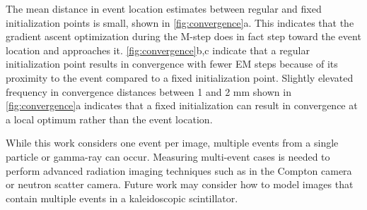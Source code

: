 The mean distance in event location estimates between regular and fixed 
initialization points is small, shown in \cref{fig:convergence}a.
This indicates that the gradient ascent optimization during the M-step does in 
fact step toward the event location and approaches it.
\cref{fig:convergence}b,c indicate that a regular initialization point results in 
convergence with fewer EM steps because of its proximity to the event compared to 
a fixed initialization point. 
Slightly elevated frequency in convergence distances between 1 and 2 mm shown in 
\cref{fig:convergence}a indicates that a fixed initialization can result in 
convergence at a local optimum rather than the event location.

While this work considers one event per image, multiple events from a single 
particle or gamma-ray can occur. 
Measuring multi-event cases is needed to perform advanced radiation imaging 
techniques such as in the Compton camera or neutron scatter camera.
Future work may consider how to model images that contain multiple events in a 
kaleidoscopic scintillator.

\iffalse
\textcolor{red}{
While this work models one event, multiple events from a single particle or 
gamma-ray can occur. 
For example, a neutron or gamma-ray can scatter one or more times before exiting 
or being absorbed in the scintillator.
Measuring a pair of scatter-absorption events from a single particle forms the 
basis for backprojection to determine the particle's trajectory and the radiation 
source's location.
In general, the ability to measure multiple, simultaneous events allows to 
accurately measure how and where a particle interacted in the scintillator.
Adequate energy, spatial, and time resolutions are required to perform the Compton backprojection.
SPAD camera designs have sufficient spatial and time resolutions, but 
they are limited by low light collection.
Now, the kaleidoscopic scintillator may provide the light collection levels needed 
to perform these advanced techniques with a SPAD camera.
Future work may consider how to model images that contain multiple events in a 
kaleidoscopic scintillator.
}
\fi
